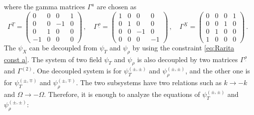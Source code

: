 \documentclass[11pt,a4paper]{article}
\newcommand{\ra}{\rightarrow}
\begin{document}
where the gamma matrices $\Gamma^a$ are chosen as
\begin{equation}
    \Gamma^{\underline{T}}=\begin{pmatrix}
    0 & 0 & 0 & 1 \\
    0 & 0 & -1 & 0 \\
    0 & 1 & 0 & 0 \\
    -1 & 0 & 0 & 0
    \end{pmatrix}\,,\quad
    \Gamma^{\underline{\rho}}=\begin{pmatrix}
    1 & 0 & 0 & 0 \\
    0 & 1 & 0 & 0 \\
    0 & 0 & -1 & 0 \\
    0 & 0 & 0 & -1
    \end{pmatrix}\,,\quad
    \Gamma^{\underline{X}}=\begin{pmatrix}
    0 & 0 & 0 & 1 \\
    0 & 0 & 1 & 0 \\
    0 & 1 & 0 & 0 \\
    1 & 0 & 0 & 0
    \end{pmatrix}\,.
\end{equation}
The $\psi_X$ can be decoupled from $\psi_T$ and $\psi_\rho$ by using the constraint \eqref{eq:Rarita const a}. The system of two field $\psi_T$ and $\psi_\rho$ is also decoupled by two matrices $\Gamma^{\underline{\rho}}$ and $\Gamma^{(2)}$. One decoupled system is for $\psi_T^{(\pm,\pm)}$ and $\psi_\rho^{(\pm,\pm)}$, and the other one is for $\psi_T^{(\pm,\mp)}$ and $\psi_\rho^{(\pm,\mp)}$. The two subsystems have two relations such as $k\ra -k$ and $ \Omega \ra - \Omega $. Therefore, it is enough to analyze the equations of $\psi_T^{(\pm,\pm)}$ and $\psi_\rho^{(\pm,\pm)}$:
\end{document}
